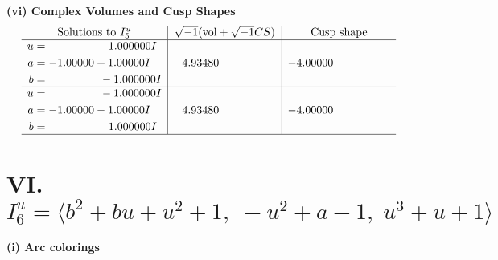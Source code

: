 \documentclass[1p]{elsarticle_modified}
\theoremstyle{definition}
\newcommand{\I}{\sqrt{-1}}
\begin{document}
\newpage\flushleft \textbf{(vi) Complex Volumes and Cusp Shapes}
$$\begin{array}{c|c|c}  
\text{Solutions to }I^u_{5}& \I (\text{vol} + \sqrt{-1}CS) & \text{Cusp shape}\\
 \hline 
\begin{aligned}
u &= \phantom{-0.000000 -}1.000000 I \\
a &= -1.00000 + 1.00000 I \\
b &= \phantom{-0.000000 } -1.000000 I\end{aligned}
 & \phantom{-}4.93480\phantom{ +0.000000I} & -4.00000\phantom{ +0.000000I} \\ \hline\begin{aligned}
u &= \phantom{-0.000000 } -1.000000 I \\
a &= -1.00000 - 1.00000 I \\
b &= \phantom{-0.000000 -}1.000000 I\end{aligned}
 & \phantom{-}4.93480\phantom{ +0.000000I} & -4.00000\phantom{ +0.000000I}\\
 \hline 
 \end{array}$$\newpage\newpage\renewcommand{\arraystretch}{1}
\centering \section*{VI. $I^u_{6}= \langle b^2+b u+u^2+1,\;- u^2+a-1,\;u^3+u+1 \rangle$}
\flushleft \textbf{(i) Arc colorings}\\
\end{document}

